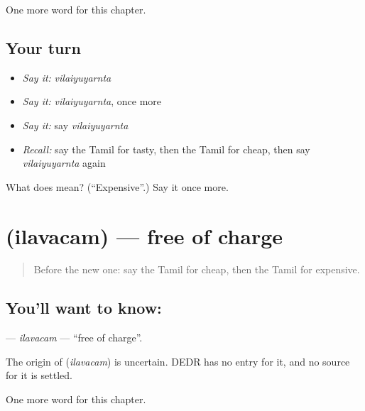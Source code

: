 \begin{grammarlens}[title={What you've built}]
One more word for this chapter.
\end{grammarlens}

\subsection*{Your turn}
\begin{itemize}
\raggedright
  \item \emph{Say it:} \emph{vilaiyuyarnta}
  \item \emph{Say it:} \emph{vilaiyuyarnta}, once more
  \item \emph{Say it:} say \emph{vilaiyuyarnta}
  \item \emph{Recall:} say the Tamil for tasty, then the Tamil for cheap, then say \emph{vilaiyuyarnta} again
\end{itemize}

\begin{tcolorbox}[breakable,colback=teal!4,colframe=teal!35!black,title={Before you move on}]
What does  mean? (\textquotedblleft{}Expensive\textquotedblright{}.) Say it once more.
\end{tcolorbox}
\section[\texorpdfstring{\ta{இலவசம்} (ilavacam)}{இலவசம் (ilavacam)}]{ (ilavacam) — free of charge}

\label{lesson:TA-C178-ilavacam}



\begin{quote}
Before the new one: say the Tamil for cheap, then the Tamil for expensive.
\end{quote}

\subsection*{You'll want to know: }
\textbf{} — \emph{ilavacam} — \textquotedblleft{}free of charge\textquotedblright{}.

\begin{cousinweb}
The origin of \textbf{} (\emph{ilavacam}) is uncertain. DEDR has no entry for it, and no source for it is settled.
\end{cousinweb}

\begin{grammarlens}[title={What you've built}]
One more word for this chapter.
\end{grammarlens}

